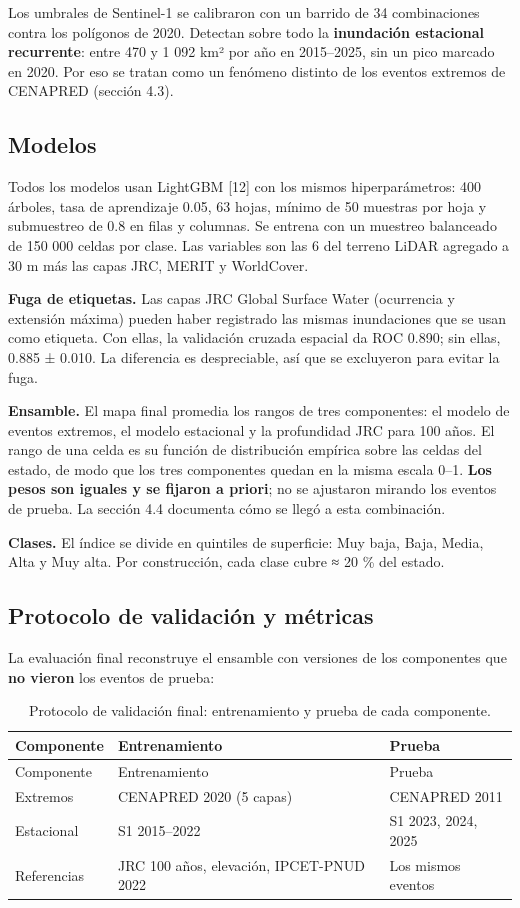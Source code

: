 Los umbrales de Sentinel-1 se calibraron con un barrido de 34 combinaciones contra los polígonos de 2020. Detectan sobre todo la \textbf{inundación estacional recurrente}: entre 470 y 1 092 km² por año en 2015--2025, sin un pico marcado en 2020. Por eso se tratan como un fenómeno distinto de los eventos extremos de CENAPRED (sección 4.3).

\subsection{Modelos}

Todos los modelos usan LightGBM {[}12{]} con los mismos hiperparámetros: 400 árboles, tasa de aprendizaje 0.05, 63 hojas, mínimo de 50 muestras por hoja y submuestreo de 0.8 en filas y columnas. Se entrena con un muestreo balanceado de 150 000 celdas por clase. Las variables son las 6 del terreno LiDAR agregado a 30 m más las capas JRC, MERIT y WorldCover.

\textbf{Fuga de etiquetas.} Las capas JRC Global Surface Water (ocurrencia y extensión máxima) pueden haber registrado las mismas inundaciones que se usan como etiqueta. Con ellas, la validación cruzada espacial da ROC 0.890; sin ellas, 0.885 ± 0.010. La diferencia es despreciable, así que se excluyeron para evitar la fuga.

\textbf{Ensamble.} El mapa final promedia los rangos de tres componentes: el modelo de eventos extremos, el modelo estacional y la profundidad JRC para 100 años. El rango de una celda es su función de distribución empírica sobre las celdas del estado, de modo que los tres componentes quedan en la misma escala 0--1. \textbf{Los pesos son iguales y se fijaron a priori}; no se ajustaron mirando los eventos de prueba. La sección 4.4 documenta cómo se llegó a esta combinación.

\textbf{Clases.} El índice se divide en quintiles de superficie: Muy baja, Baja, Media, Alta y Muy alta. Por construcción, cada clase cubre ≈ 20 \% del estado.

\subsection{Protocolo de validación y métricas}

La evaluación final reconstruye el ensamble con versiones de los componentes que \textbf{no vieron} los eventos de prueba:

\begin{longtable}[]{@{}lll@{}}
\caption{Protocolo de validación final: entrenamiento y prueba de cada componente.}\tabularnewline
\toprule\noalign{}
Componente & Entrenamiento & Prueba \\
\midrule\noalign{}
\endfirsthead
\toprule\noalign{}
Componente & Entrenamiento & Prueba \\
\midrule\noalign{}
\endhead
\bottomrule\noalign{}
\endlastfoot
Extremos & CENAPRED 2020 (5 capas) & CENAPRED 2011 \\
Estacional & S1 2015--2022 & S1 2023, 2024, 2025 \\
Referencias & JRC 100 años, elevación, IPCET-PNUD 2022 & Los mismos eventos \\
\end{longtable}

